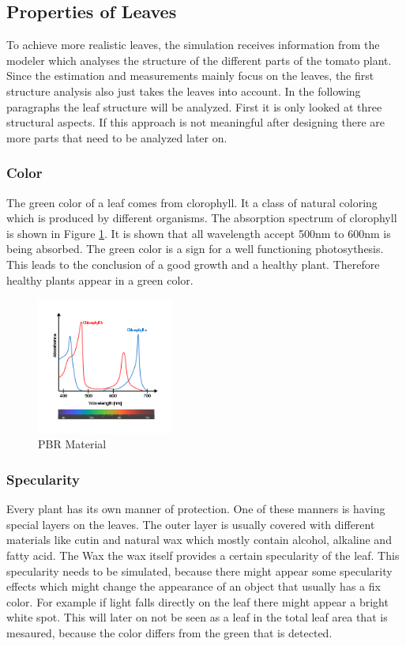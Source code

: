 
\graphicspath{{members/kh/Pictures/}}

\subsection{Properties of Leaves}

To achieve more realistic leaves, the simulation receives information from the modeler which analyses the structure of the different parts of the tomato plant. Since the estimation and measurements mainly focus on the leaves, the first structure analysis also just takes the leaves into account.
In the following paragraphs the leaf structure will be analyzed. First it is only looked at three structural aspects. If this approach is not meaningful after designing there are more parts that need to be analyzed later on.

\subsubsection{Color}
The green color of a leaf comes from clorophyll. It a class of natural coloring which is produced by different organisms. 
The absorption spectrum of clorophyll is shown in Figure \ref{clorophyll}. It is shown that all wavelength accept 500nm to 600nm is being absorbed. The green color is a sign for a well functioning  photosythesis. This leads to the conclusion of a good growth and a healthy plant. Therefore healthy plants appear in a green color.

\begin{figure}[h]
	\centering
	\includegraphics[width=0.4\textwidth]{wavelength.png}
	\caption{PBR Material}
	\label{clorophyll}
\end{figure}

\subsubsection{Specularity}
Every plant has its own manner of protection. One of these manners is having special layers on the leaves. The outer layer is usually covered with different materials like cutin and natural wax which mostly contain  alcohol, alkaline and fatty acid. The Wax the wax itself provides a certain specularity of the leaf. This specularity needs to be simulated, because there might appear some specularity effects which might change the appearance of an object that usually has a fix color. For example if light falls directly on the leaf there might appear a bright white spot. This will later on not be seen as a leaf in the total leaf area that is mesaured, because the color differs from the green that is detected.

